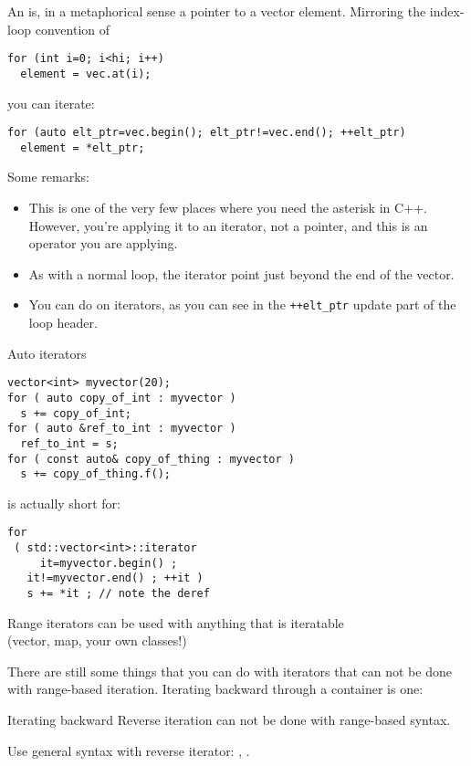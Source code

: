 An  is, in a metaphorical sense
a pointer to a vector element.
Mirroring the index-loop convention of
\begin{lstlisting}
for (int i=0; i<hi; i++)
  element = vec.at(i);
\end{lstlisting}
you can iterate:
\begin{lstlisting}
for (auto elt_ptr=vec.begin(); elt_ptr!=vec.end(); ++elt_ptr)
  element = *elt_ptr;
\end{lstlisting}
Some remarks:
\begin{itemize}
\item This is one of the very few places where you need the asterisk in C++.
  However, you're applying it to an iterator, not a pointer,
  and this is an operator you are applying.
\item As with a normal loop, the  iterator point just beyond the end
  of the vector.
\item You can do  on iterators, as
  you can see in the \lstinline|++elt_ptr| update part of the loop header.
\end{itemize}

\begin{block}{Auto iterators}
  \label{sl:auto-iterator}
  \begin{multicols}{2}
\begin{lstlisting}
vector<int> myvector(20);
for ( auto copy_of_int : myvector )
  s += copy_of_int;
for ( auto &ref_to_int : myvector )
  ref_to_int = s;
for ( const auto& copy_of_thing : myvector )
  s += copy_of_thing.f();
\end{lstlisting}
    is actually short for:
\begin{lstlisting}
for
 ( std::vector<int>::iterator
     it=myvector.begin() ;
   it!=myvector.end() ; ++it )
   s += *it ; // note the deref
\end{lstlisting}
  \end{multicols}
  Range iterators can be used with anything that is iteratable\\
  (vector, map, your own classes!)
\end{block}

There are still some things that you can do with iterators that
can not be done with range-based iteration.
Iterating backward through a container is one:

\begin{block}{Iterating backward}
  \label{sl:reverse-iterator}
  Reverse iteration can not be done with range-based syntax.
  
  Use general syntax with reverse iterator: ,
  .
\end{block}

